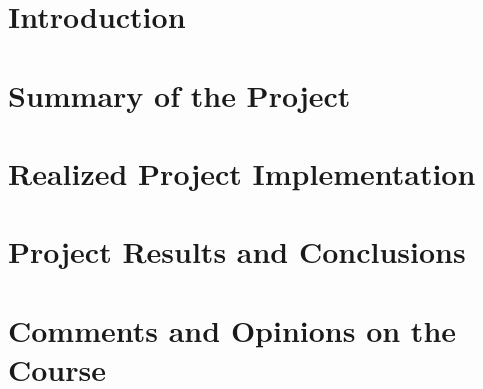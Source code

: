 \documentclass[english]{tauthesis}
\begin{document}


\tableofcontents





\mainmatter

\chapter{Introduction}
\label{ch:project_background}


\chapter{Summary of the Project}
\label{ch:project_organisation}


\chapter{Realized Project Implementation}
\label{ch:project_objectives}


\chapter{Project Results and Conclusions}
\label{ch:project_results}


\chapter{Comments and Opinions on the Course}
\label{ch:implementation}





\printbibliography[heading=bibintoc]
\end{document}
